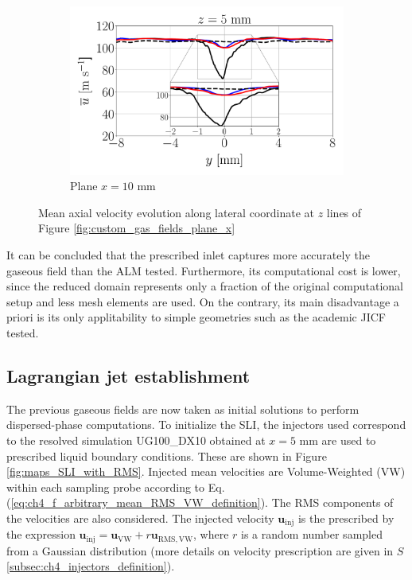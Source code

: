 \begin{figure}[ht]
\begin{subfigure}[b]{1.0\textwidth}
   \includegraphics[scale=0.24]{./part2_developments/figures_ch6_lagrangian_JICF/gas_field_initial_conditions/custom_line_x10_z05p0_ux_mean_along_y}
   \vspace*{-0.1in}
	\caption{Plane $x = 10$ mm}
\end{subfigure}
   \caption{Mean axial velocity evolution along lateral coordinate at $z$ lines of Figure \ref{fig:custom_gas_fields_plane_x}}
\label{fig:JICF_custom_lines_iso-x_along_y_ux_mean}
\end{figure}

It can be concluded that the prescribed inlet captures more accurately the gaseous field than the ALM tested. Furthermore, its computational cost is lower, since the reduced domain represents only a fraction of the original computational setup and less mesh elements are used. On the contrary, its main disadvantage a priori is its only applitability to simple geometries such as the academic JICF tested. 



\subsection{Lagrangian jet establishment}

The previous gaseous fields are now taken as initial solutions to perform dispersed-phase computations. To initialize the SLI, the injectors used correspond to the resolved simulation UG100\_DX10 obtained at $x = 5$ mm are used to prescribed liquid boundary conditions. These are shown in Figure \ref{fig:maps_SLI_with_RMS}. Injected mean velocities are Volume-Weighted (VW) within each sampling probe according to Eq. (\ref{eq:ch4_f_arbitrary_mean_RMS_VW_definition}). The RMS components of the velocities are also considered. The injected velocity $\textbf{u}_\mathrm{inj}$ is the prescribed by the expression $\textbf{u}_\mathrm{inj} = \textbf{u}_\mathrm{VW} + r \textbf{u}_\mathrm{RMS,VW}$, where $r$ is a random number sampled from a Gaussian distribution (more details on velocity prescription are given in $S$\ref{subsec:ch4_injectors_definition}).



